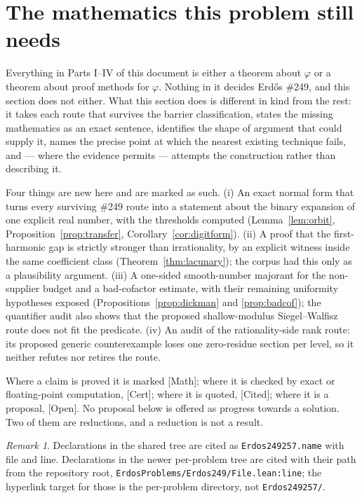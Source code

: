\documentclass[11pt]{article}
\theoremstyle{plain}
\theoremstyle{definition}
\theoremstyle{remark}
\newtheorem{rem}[thm]{Remark}
\newcommand{\ev}[1]{{\small\textsf{[#1]}}\xspace}
\begin{document}
\section{The mathematics this problem still needs}

Everything in Parts I--IV of this document is either a theorem about
$\varphi$ or a theorem about proof methods for $\varphi$. Nothing in it
decides Erd\H{o}s \#249, and this section does not either. What this section
does is different in kind from the rest: it takes each route that survives
the barrier classification, states the missing mathematics as an exact
sentence, identifies the shape of argument that could supply it, names the
precise point at which the nearest existing technique fails, and --- where
the evidence permits --- attempts the construction rather than describing it.

Four things are new here and are marked as such. (i) An exact normal form
that turns every surviving \#249 route into a statement about the binary
expansion of one explicit real number, with the thresholds computed
(Lemma~\ref{lem:orbit}, Proposition~\ref{prop:transfer},
Corollary~\ref{cor:digitform}). (ii) A proof that the first-harmonic gap is
strictly stronger than irrationality, by an explicit witness inside the same
coefficient class (Theorem~\ref{thm:lacunary}); the corpus had this only as
a plausibility argument. (iii) A one-sided smooth-number majorant for the
non-supplier budget and a bad-cofactor estimate, with their remaining
uniformity hypotheses exposed (Propositions~\ref{prop:dickman} and
\ref{prop:badcof}); the quantifier audit also shows that the proposed
shallow-modulus Siegel--Walfisz route does not fit the predicate. (iv) An
audit of the rationality-side rank route: its proposed generic counterexample
loses one zero-residue section per level, so it neither refutes nor retires
the route.

Where a claim is proved it is marked \ev{Math}; where it is checked by exact
or floating-point computation, \ev{Cert}; where it is quoted, \ev{Cited};
where it is a proposal, \ev{Open}. No proposal below is offered as progress
towards a solution. Two of them are reductions, and a reduction is not a
result.

\begin{rem}
Declarations in the shared tree are cited as
\texttt{Erdos249257.name} with file and line. Declarations in the newer
per-problem tree are cited with their path from the repository root,
\texttt{ErdosProblems/Erdos249/File.lean:line}; the hyperlink target for
those is the per-problem directory, not \texttt{Erdos249257/}.
\end{rem}
\end{document}
